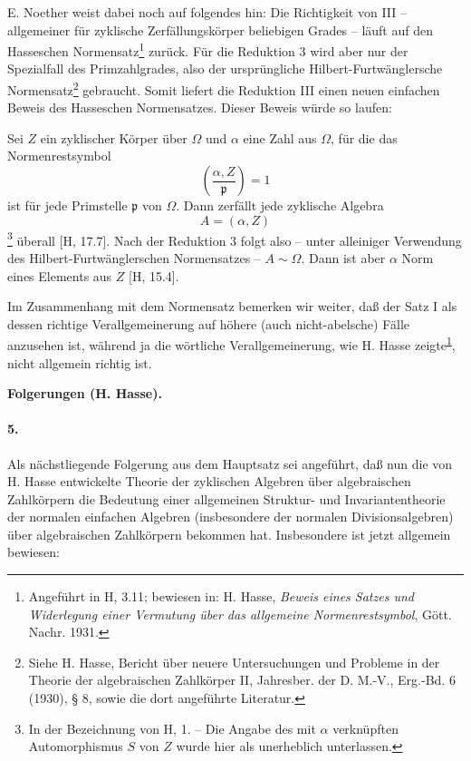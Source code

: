 
E. Noether weist dabei noch auf folgendes hin:
Die Richtigkeit von III -- allgemeiner für zyklische Zerfällungskörper beliebigen Grades -- läuft auf den Hasseschen Normensatz\footnote{\label{fn:p38-hasse-normensatz}Angeführt in H, 3.11; bewiesen in: H. Hasse, \emph{Beweis eines Satzes und Widerlegung einer Vermutung über das allgemeine Normenrestsymbol}, Gött. Nachr. 1931.} zurück. Für die Reduktion 3 wird aber nur der Spezialfall des Primzahlgrades, also der ursprüngliche Hilbert-Furtwänglersche Normensatz\footnote{Siehe H. Hasse, Bericht über neuere Untersuchungen und Probleme in der Theorie der algebraischen Zahlkörper II, Jahresber. der D. M.-V., Erg.-Bd. 6 (1930), § 8, sowie die dort angeführte Literatur.} gebraucht. Somit liefert die Reduktion III einen neuen einfachen Beweis des Hasseschen Normensatzes. Dieser Beweis würde so laufen:

Sei \(Z\) ein zyklischer Körper über \(\Omega\) und \(\alpha\) eine Zahl aus \(\Omega\), für die das Normenrestsymbol
\[
\left(\frac{\alpha,Z}{\mathfrak p}\right)=1
\]
ist für jede Primstelle \(\mathfrak p\) von \(\Omega\). Dann zerfällt jede zyklische Algebra
\[
A=(\alpha,Z)
\]
\footnote{\label{fn:p38-hasse-notation}In der Bezeichnung von H, 1. -- Die Angabe des mit \(\alpha\) verknüpften Automorphismus \(S\) von \(Z\) wurde hier als unerheblich unterlassen.} überall [H, 17.7]. Nach der Reduktion 3 folgt also -- unter alleiniger Verwendung des Hilbert-Furtwänglerschen Normensatzes -- \(A\sim\Omega\). Dann ist aber \(\alpha\) Norm eines Elements aus \(Z\) [H, 15.4].

Im Zusammenhang mit dem Normensatz bemerken wir weiter, daß der Satz I als dessen richtige Verallgemeinerung auf höhere (auch nicht-abelsche) Fälle anzusehen ist, während ja die wörtliche Verallgemeinerung, wie H. Hasse zeigte\textsuperscript{\ref{fn:p38-hasse-normensatz}}, nicht allgemein richtig ist.

\begin{center}
\textbf{Folgerungen (H. Hasse).}
\end{center}

\paragraph{5.}
Als nächstliegende Folgerung aus dem Hauptsatz sei angeführt, daß nun die von H. Hasse entwickelte Theorie der zyklischen Algebren über algebraischen Zahlkörpern die Bedeutung einer allgemeinen Struktur- und Invariantentheorie der normalen einfachen Algebren (insbesondere der normalen Divisionsalgebren) über algebraischen Zahlkörpern bekommen hat. Insbesondere ist jetzt allgemein bewiesen:

